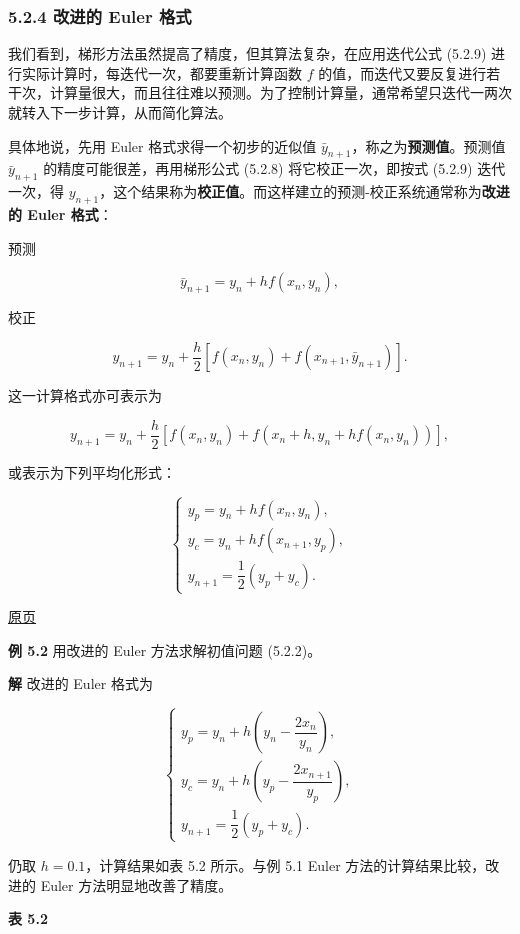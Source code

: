 \documentclass[
  10pt,
  fontset=fandol]{ctexart}
\begin{document}
\subsubsection{5.2.4 改进的 Euler 格式}\label{ux6539ux8fdbux7684-euler-ux683cux5f0f}

我们看到，梯形方法虽然提高了精度，但其算法复杂，在应用迭代公式 (5.2.9) 进行实际计算时，每迭代一次，都要重新计算函数 \(f\) 的值，而迭代又要反复进行若干次，计算量很大，而且往往难以预测。为了控制计算量，通常希望只迭代一两次就转入下一步计算，从而简化算法。

具体地说，先用 Euler 格式求得一个初步的近似值 \(\bar y_{n+1}\)，称之为\textbf{预测值}。预测值 \(\bar y_{n+1}\) 的精度可能很差，再用梯形公式 (5.2.8) 将它校正一次，即按式 (5.2.9) 迭代一次，得 \(y_{n+1}\)，这个结果称为\textbf{校正值}。而这样建立的预测-校正系统通常称为\textbf{改进的 Euler 格式}：

预测

\[
\bar y_{n+1}=y_n+hf(x_n,y_n),\tag{5.2.10}
\]

校正

\[
y_{n+1}=y_n+\frac{h}{2}[f(x_n,y_n)+f(x_{n+1},\bar y_{n+1})].\tag{5.2.11}
\]

这一计算格式亦可表示为

\[
y_{n+1}=y_n+\frac{h}{2}[f(x_n,y_n)+f(x_n+h,y_n+hf(x_n,y_n))],\tag{5.2.12}
\]

或表示为下列平均化形式：

\[
\begin{cases}
y_p=y_n+hf(x_n,y_n),\\
y_c=y_n+hf(x_{n+1},y_p),\\
y_{n+1}=\dfrac{1}{2}(y_p+y_c).
\end{cases}
\]

\href{../../source-images/pdf-124.jpeg}{原页}

\textbf{例 5.2} 用改进的 Euler 方法求解初值问题 (5.2.2)。

\textbf{解} 改进的 Euler 格式为

\[
\begin{cases}
y_p=y_n+h\left(y_n-\dfrac{2x_n}{y_n}\right),\\
y_c=y_n+h\left(y_p-\dfrac{2x_{n+1}}{y_p}\right),\\
y_{n+1}=\dfrac{1}{2}(y_p+y_c).
\end{cases}
\]

仍取 \(h=0.1\)，计算结果如表 5.2 所示。与例 5.1 Euler 方法的计算结果比较，改进的 Euler 方法明显地改善了精度。

\textbf{表 5.2}
\end{document}
